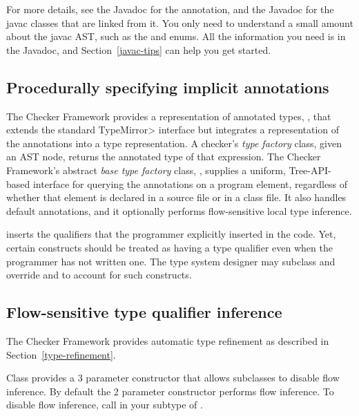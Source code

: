 For more details, see the Javadoc for the 
  annotation, and the Javadoc for the javac classes that are linked from
it.  You only need to understand a small amount about the javac AST, such
as the
and
enums.  All the information you need is in the Javadoc, and
Section~\ref{javac-tips} can help you get started.


\subsection{Procedurally specifying implicit annotations}


The Checker Framework provides a representation of annotated types,
, that extends the standard \<TypeMirror>
interface but integrates a representation of the annotations into a
type representation.  A checker's \emph{type factory} class, given an AST
node, returns the annotated type of that expression.  The Checker
Framework's abstract
\emph{base type factory} class, ,
supplies a uniform, Tree-API-based interface
for querying the annotations on a program element, regardless of
whether that element is declared in a source file or in a class file.
It also handles default annotations, and it optionally performs
flow-sensitive local type inference.

 inserts the qualifiers that the programmer
explicitly inserted in the code.  Yet, certain constructs should be
treated as having a type qualifier even when the programmer has not
written one.  The type system designer may subclass
 and override
 and
 to account for
such constructs.


\subsection{Flow-sensitive type qualifier inference}

The Checker Framework provides automatic type refinement as described
in Section~\ref{type-refinement}.

Class
provides a 3 parameter constructor that allows subclasses to disable
flow inference.
By default the 2 parameter constructor performs flow inference.
To disable flow inference, call
in your subtype of
.


